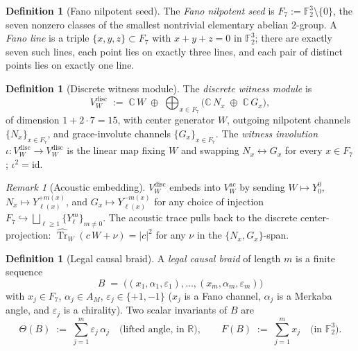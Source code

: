 \documentclass[11pt,a4paper]{article}
\theoremstyle{plain}
\theoremstyle{definition}
\newtheorem{definition}[theorem]{Definition}
\theoremstyle{remark}
\newtheorem{remark}[theorem]{Remark}
\numberwithin{equation}{section}
\newcommand{\Complex}{\mathbb{C}}
\newcommand{\R}{\mathbb{R}}
\newcommand{\F}{\mathbb{F}}
\DeclareMathOperator{\Tr}{Tr}
\providecommand{\id}{\mathrm{id}}
\begin{document}
\medskip

\begin{definition}[Fano nilpotent seed]
\label{def:fano-seed}
The \emph{Fano nilpotent seed} is $F_7:=\F_2^3\setminus\{0\}$, the
seven nonzero classes of the smallest nontrivial elementary abelian
$2$-group.  A \emph{Fano line} is a triple
$\{x,y,z\}\subset F_7$ with $x+y+z=0$ in $\F_2^3$; there are exactly
seven such lines, each point lies on exactly three lines, and each
pair of distinct points lies on exactly one line.
\end{definition}

\medskip

\begin{definition}[Discrete witness module]
\label{def:vw-discrete}
The \emph{discrete witness module} is
\[
  V_W^{\mathrm{disc}}
  \;:=\;\Complex\,W\;\oplus\;\bigoplus_{x\in F_7}
        \bigl(\Complex\,N_x\;\oplus\;\Complex\,G_x\bigr),
\]
of dimension $1+2\cdot 7=15$, with center generator $W$, outgoing
nilpotent channels $\{N_x\}_{x\in F_7}$, and grace-involute channels
$\{G_x\}_{x\in F_7}$.  The \emph{witness involution}
$\iota:V_W^{\mathrm{disc}}\to V_W^{\mathrm{disc}}$ is the linear map
fixing $W$ and swapping $N_x\leftrightarrow G_x$ for every
$x\in F_7$; $\iota^2=\id$.
\end{definition}

\begin{remark}[Acoustic embedding]
\label{rmk:acoustic-embedding}
$V_W^{\mathrm{disc}}$ embeds into $V_W^{\mathrm{ac}}$ by sending
$W\mapsto Y_0^0$, $N_x\mapsto Y_{\ell(x)}^{+m(x)}$, and
$G_x\mapsto Y_{\ell(x)}^{-m(x)}$ for any choice of injection
$F_7\hookrightarrow\bigsqcup_{\ell\ge 1}\{Y_\ell^m\}_{m\ne 0}$.
The acoustic trace pulls back to the discrete center-projection:
$\widehat{\Tr}_W(c\,W+\nu)=|c|^2$ for any $\nu$ in the
$\{N_x,G_x\}$-span.
\end{remark}

\medskip

\begin{definition}[Legal causal braid]
\label{def:legal-braid}
A \emph{legal causal braid} of length $m$ is a finite sequence
\[
  B\;=\;\bigl((x_1,\alpha_1,\varepsilon_1),\dots,
            (x_m,\alpha_m,\varepsilon_m)\bigr)
\]
with $x_j\in F_7$, $\alpha_j\in A_M$, $\varepsilon_j\in\{+1,-1\}$
($x_j$ is a Fano channel, $\alpha_j$ is a Merkaba angle, and
$\varepsilon_j$ is a chirality).  Two scalar invariants of $B$ are
\[
  \Theta(B)\;:=\;\sum_{j=1}^m\varepsilon_j\,\alpha_j
  \quad\text{(lifted angle, in $\R$)},\qquad
  F(B)\;:=\;\sum_{j=1}^m x_j\quad\text{(in $\F_2^3$)}.
\]
\end{definition}
\end{document}
